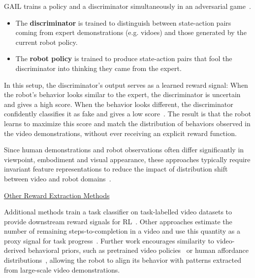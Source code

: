 \ac{GAIL} trains a policy and a discriminator simultaneously in an adversarial game~\cite{Ho2016GenerativeAI, Torabi2018GenerativeAI}.
\begin{itemize}
    \item The \textbf{discriminator} is trained to distinguish between state-action pairs coming from expert demonstrations (e.g. vidoes) and those generated by the current robot policy.
    \item The \textbf{robot policy} is trained to produce state-action pairs that fool the discriminator into thinking they came from the expert.
\end{itemize}
In this setup, the discriminator's output serves as a learned reward signal: When the robot's behavior looks similar to the expert, the discriminator is uncertain and gives a high score. When the behavior looks different, the discriminator confidently classifies it as fake and gives a low score~\cite{Torabi2018GenerativeAI}. 
The result is that the robot learns to maximize this score and match the distribution of behaviors observed in the video demonstrations, without ever receiving an explicit reward function.


Since human demonstrations and robot observations often differ significantly in viewpoint, embodiment and visual appearance, these approaches typically require invariant feature representations to reduce the impact of distribution shift between video and robot domains~\cite{Qin2021DexMVIL, Stadie2017ThirdPersonIL}.



\underline{Other Reward Extraction Methods}

Additional methods train a task classifier on task-labelled video datasets to provide downstream reward signals for \ac{RL}~\cite{Chen2021LearningGR, Shao2020Concept2RobotLM}. 
Other approaches estimate the number of remaining steps-to-completion in a video and use this quantity as a proxy signal for task progress~\cite{Edwards2019PerceptualVF, Yang2023LearningIR}.
Further work encourages similarity to video-derived behavioral priors, such as pretrained video policies~\cite{Ye2023ReinforcementLW} or human affordance distributions~\cite{Bahl2023AffordancesFH}, allowing the robot to align its behavior with patterns extracted from large-scale video demonstrations.


